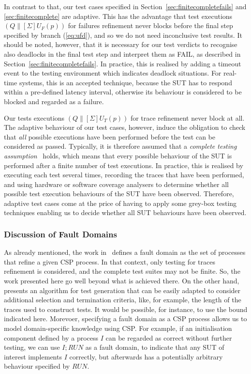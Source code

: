 In contrast to that, our test cases specified in
Section~\ref{sec:finitecompletefails} and \ref{sec:finitecomplete} are
adaptive. This has the advantage that test executions $(Q\parallel[\Sigma]
U_F(p))$ for failures refinement never blocks before the final step specified
by branch (\ref{eq:ufd}), and so we do not need inconclusive test results. It
should be noted, however, that it is necessary for our test verdicts to
recognise also deadlocks in the final test step and interpret them as FAIL,
as described in Section~\ref{sec:finitecompletefails}. In practice, this is
realised by adding a timeout event to the testing environment which indicates
deadlock situations. For real-time systems, this is an accepted technique,
because the SUT has to respond within a pre-defined latency interval,
otherwise its behaviour is considered to be blocked and regarded as a
failure. 

Our tests executions $(Q\parallel[\Sigma] U_T(p))$ for trace refinement never
block at all. The adaptive behaviour of our test cases, however, induce the
obligation to check that {\it all} possible executions have been performed
before the test can be considered as passed. Typically, it is therefore
assumed that a \emph{complete testing assumption}~\cite{hierons_testing_2004}
holds, which means that every possible behaviour of the SUT is performed
after a finite number of test executions. In practice, this is realised by
executing each test several times, recording the traces that have been
performed, and using hardware or software coverage analysers to determine
whether all possible test execution behaviours of the SUT have been observed.
Therefore, adaptive test cases come at the price of having to apply some
grey-box testing techniques enabling us to decide whether all SUT behaviours
have been observed.

\subsubsection*{Discussion of Fault Domains}
As already mentioned, the work in~\cite{DBLP:conf/pts/CavalcantiS17} defines
a fault domain as the set of processes that refine a given CSP process.  In
that context, only testing for traces refinement is considered, and the
complete test suites may not be finite. So, the work presented here go well
beyond what is achieved there. On the other hand,
\cite{DBLP:conf/pts/CavalcantiS17} presents an algorithm for test generation
that can be easily adapted to consider additional selection and termination
criteria, like, for example, the length of the traces used to construct
tests. It would be possible, for instance, to use the bound indicated here.
Morevoer, specifying a fault domain as a CSP process allows us to model
domain-specific knowledge using CSP. For example, if an initialisation
component defined by a process $I$ can be regarded as correct without further
testing, we can use $I; RUN$ as a fault domain, to indicate that any SUT of
interest implements $I$ correctly, but afterwards has a potentially arbitrary
behaviour specified by $RUN$.

